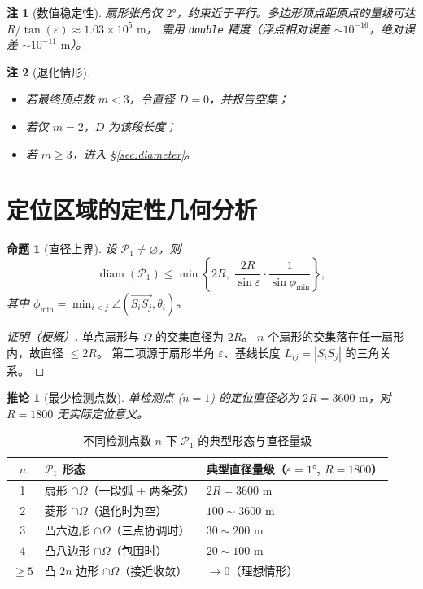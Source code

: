 \documentclass[a4paper,11pt]{article}
\newtheorem{proposition}{命题}
\newtheorem{corollary}{推论}
\newtheorem{remark}{注}
\begin{document}
\begin{remark}[数值稳定性]
扇形张角仅 $2°$，约束近于平行。多边形顶点距原点的量级可达
$R/\tan(\varepsilon)\approx 1.03\times 10^5\text{ m}$，
需用 \texttt{double} 精度（浮点相对误差 $\sim 10^{-16}$，绝对误差 $\sim 10^{-11}\text{ m}$）。
\end{remark}

\begin{remark}[退化情形]
\begin{itemize}[leftmargin=2em]
\item 若最终顶点数 $m<3$，令直径 $D=0$，并报告空集；
\item 若仅 $m=2$，$D$ 为该段长度；
\item 若 $m\ge 3$，进入 \S\ref{sec:diameter}。
\end{itemize}
\end{remark}

\section{定位区域的定性几何分析}\label{sec:qualitative}

\begin{proposition}[直径上界]\label{prop:upperbound}
设 $\mathcal P_1\neq\varnothing$，则
\[
\operatorname{diam}(\mathcal P_1)\le \min\left\{2R,\;
\frac{2R}{\sin\varepsilon}\cdot\frac{1}{\sin\phi_{\min}}\right\},
\]
其中 $\phi_{\min}=\min_{i<j}\angle(\overrightarrow{S_iS_j},\theta_i)$。
\end{proposition}

\begin{proof}[证明（梗概）]
单点扇形与 $\Omega$ 的交集直径为 $2R$。
$n$ 个扇形的交集落在任一扇形内，故直径 $\le 2R$。
第二项源于扇形半角 $\varepsilon$、基线长度 $L_{ij}=|S_iS_j|$ 的三角关系。
\end{proof}

\begin{corollary}[最少检测点数]
单检测点 ($n=1$) 的定位直径必为 $2R=3600\text{ m}$，对 $R=1800$ 无实际定位意义。
\end{corollary}

\begin{table}[H]
\centering
\caption{不同检测点数 $n$ 下 $\mathcal P_1$ 的典型形态与直径量级}\label{tab:regimes}
\begin{tabular}{cll}
\toprule
$n$ & $\mathcal P_1$ 形态 & 典型直径量级（$\varepsilon=1°$, $R=1800$）\\
\midrule
1 & 扇形 $\cap\Omega$（一段弧 + 两条弦） & $2R=3600\text{ m}$ \\
2 & 菱形 $\cap\Omega$（退化时为空） & $100\sim 3600\text{ m}$ \\
3 & 凸六边形 $\cap\Omega$（三点协调时） & $30\sim 200\text{ m}$ \\
4 & 凸八边形 $\cap\Omega$（包围时） & $20\sim 100\text{ m}$ \\
$\ge 5$ & 凸 $2n$ 边形 $\cap\Omega$（接近收敛） & $\to 0$（理想情形）\\
\bottomrule
\end{tabular}
\end{table}
\end{document}
